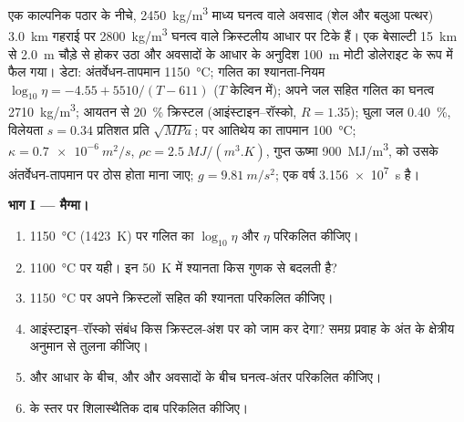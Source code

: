 \begin{problem}
\label{pb:b2:magma-emplacement:1}
एक काल्पनिक पठार के नीचे, \qty{2450}{kg/m^3} माध्य घनत्व वाले अवसाद (शेल और बलुआ पत्थर)
\qty{3.0}{km} गहराई पर \qty{2800}{kg/m^3} घनत्व वाले क्रिस्टलीय आधार पर टिके हैं।
एक बेसाल्टी  \qty{15}{km} से \qty{2.0}{m} चौड़े  से होकर उठा
और अवसादों के आधार के अनुदिश \qty{100}{m} मोटी डोलेराइट  के रूप में फैल गया।
डेटा: अंतर्वेधन-तापमान \qty{1150}{\celsius}; गलित का
श्यानता-नियम $\log_{10}\eta = -4.55 + 5510/(T - 611)$ ($T$ केल्विन में); अपने जल सहित गलित का
घनत्व \qty{2710}{kg/m^3}; आयतन से \qty{20}{\percent} क्रिस्टल
(आइंस्टाइन--रॉस्को, $R = 1.35$); घुला जल \qty{0.40}{\percent}, विलेयता
$s = 0.34$ प्रतिशत प्रति $\sqrt{\unit{MPa}}$;  पर आतिथेय का तापमान
\qty{100}{\celsius}; $\kappa = \qty{0.7e-6}{m^2/s}$, $\rho c = \qty{2.5}{MJ/(m^3.K)}$,
गुप्त ऊष्मा \qty{900}{MJ/m^3},  को उसके
अंतर्वेधन-तापमान पर ठोस होता माना जाए; $g = \qty{9.81}{m/s^2}$; एक वर्ष \qty{3.156e7}{s} है।

\medskip\noindent\textbf{भाग I --- मैग्मा।}
\begin{enumerate}
\item \qty{1150}{\celsius} (\qty{1423}{K}) पर गलित का $\log_{10}\eta$ और $\eta$
परिकलित कीजिए।
\item \qty{1100}{\celsius} पर यही। इन \qty{50}{K} में श्यानता
किस गुणक से बदलती है?
\item \qty{1150}{\celsius} पर अपने क्रिस्टलों सहित  की श्यानता
परिकलित कीजिए।
\item आइंस्टाइन--रॉस्को संबंध किस क्रिस्टल-अंश पर
 को जाम कर देगा? समग्र प्रवाह के अंत के क्षेत्रीय अनुमान से तुलना कीजिए।
\item {} और आधार के बीच, और
 और अवसादों के बीच घनत्व-अंतर परिकलित कीजिए।
\item {} के स्तर पर शिलास्थैतिक दाब परिकलित कीजिए।
\end{enumerate}


\end{problem}
